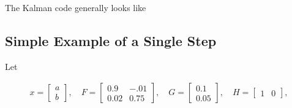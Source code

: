 The Kalman code generally looks like

\begin{Shaded}
\begin{Highlighting}[]
\OperatorTok{=} \OperatorTok{:}
\OperatorTok{=}\OperatorTok{*}\NormalTok{ x\_estimate[k}\OperatorTok{{-}}\NormalTok{] }\OperatorTok{+}
\OperatorTok{=}\OperatorTok{*}\NormalTok{ (P\_variance[k}\OperatorTok{{-}}\NormalTok{] }\OperatorTok{*}\OperatorTok{+}
\OperatorTok{=}\OperatorTok{{-}}\OperatorTok{*}
\OperatorTok{=}\OperatorTok{*}\OperatorTok{*}\OperatorTok{+}
\OperatorTok{=}\OperatorTok{*}\OperatorTok{*}
\OperatorTok{=}\OperatorTok{+}\OperatorTok{*}
\OperatorTok{=}\OperatorTok{{-}}\OperatorTok{*}\OperatorTok{*}
\end{Highlighting}
\end{Shaded}

\hypertarget{simple-example-of-a-single-step}{%
\subsection{Simple Example of a Single
Step}\label{simple-example-of-a-single-step}}

Let

\[\begin{aligned}
x = \begin{bmatrix}a \\ b\end{bmatrix}, \quad F = \begin{bmatrix} 0.9 &-.01 \\0.02 &0.75\end{bmatrix},
\quad G = \begin{bmatrix} 0.1\\ 0.05\end{bmatrix}, \quad H = \begin{bmatrix} 1& 0 \end{bmatrix},
\end{aligned}\]

